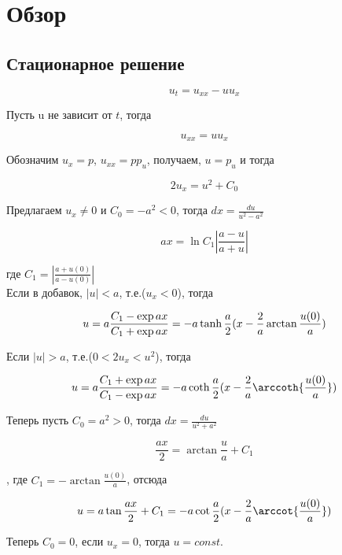 \section{Обзор}
\vspace{1em}

\subsection{Стационарное решение}

\begin{equation}
  u_t = u_{xx} - uu_x  
\end{equation}

Пусть u не зависит от $t$, тогда 

\begin{equation}
  u_{xx} = uu_x
\end{equation}

Обозначим $u_x = p$, $u_{xx} = pp_u$, получаем, $u = p_u$ и тогда

\begin{equation}
  2u_x = u^2 + C_0
\end{equation}

Предлагаем $u_x \neq 0$ и $C_0 = -a^2 < 0$, тогда $dx = \frac{du}{u^2 - a^2}$

\begin{equation}
  ax = \ln{C_1 |\frac{a - u}{a + u}|}
\end{equation}

где $C_1 = |\frac{a + u(0)}{a - u(0)}|$\\
Если в добавок, $|u| < a$, т.е.($u_x < 0$), тогда

\begin{equation}
  u = a \frac{C_1 - \exp{ax}}{C_1 + \exp{ax}} = -a \tanh{\frac{a}{2}(x - \frac{2}{a} \operatorname{arctan}{\frac{u(0)}{a}})}   
\end{equation} 

Если  $|u| > a$, т.е.($0 < 2u_x < u^2$), тогда

\begin{equation}
  u = a \frac{C_1 + \exp{ax}}{C_1 - \exp{ax}} = -a \coth{\frac{a}{2}(x - \frac{2}{a} \arccoth{\frac{u(0)}{a}})}   
\end{equation} 

Теперь пусть $C_0 = a^2 > 0$, тогда $dx = \frac{du}{u^2 + a^2}$

\begin{equation}
  \frac{ax}{2} = \arctan{\frac{u}{a}} + C_1
\end{equation}

, где $C_1 = -\arctan{\frac{u(0)}{a}}$, отсюда 

\begin{equation}
  u = a \tan{\frac{ax}{2} + C_1} = -a \cot{\frac{a}{2}(x - \frac{2}{a} \arccot{\frac{u(0)}{a}})}
\end{equation}

Теперь $C_0 = 0$, если $u_x = 0$, тогда $u = const$. 